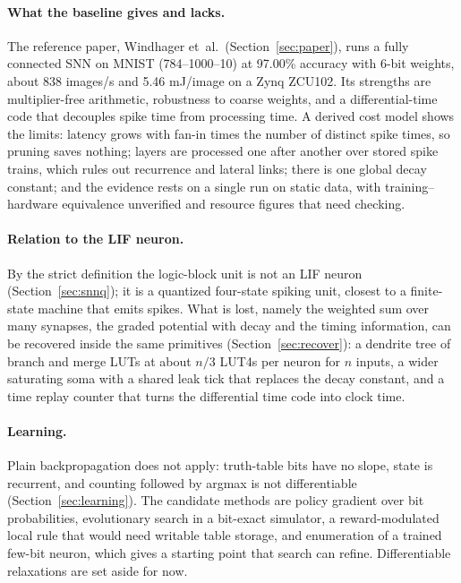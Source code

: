 \paragraph{What the baseline gives and lacks.} The reference paper, Windhager et~al.\ (Section~\ref{sec:paper}), runs a fully connected SNN on MNIST (784--1000--10) at 97.00\% accuracy with 6-bit weights, about 838 images/s and 5.46 mJ/image on a Zynq ZCU102. Its strengths are multiplier-free arithmetic, robustness to coarse weights, and a differential-time code that decouples spike time from processing time. A derived cost model shows the limits: latency grows with fan-in times the number of distinct spike times, so pruning saves nothing; layers are processed one after another over stored spike trains, which rules out recurrence and lateral links; there is one global decay constant; and the evidence rests on a single run on static data, with training--hardware equivalence unverified and resource figures that need checking.

\paragraph{Relation to the LIF neuron.} By the strict definition the logic-block unit is not an LIF neuron (Section~\ref{sec:snnq}); it is a quantized four-state spiking unit, closest to a finite-state machine that emits spikes. What is lost, namely the weighted sum over many synapses, the graded potential with decay and the timing information, can be recovered inside the same primitives (Section~\ref{sec:recover}): a dendrite tree of branch and merge LUTs at about $n/3$ LUT4s per neuron for $n$ inputs, a wider saturating soma with a shared leak tick that replaces the decay constant, and a time replay counter that turns the differential time code into clock time.

\paragraph{Learning.} Plain backpropagation does not apply: truth-table bits have no slope, state is recurrent, and counting followed by argmax is not differentiable (Section~\ref{sec:learning}). The candidate methods are policy gradient over bit probabilities, evolutionary search in a bit-exact simulator, a reward-modulated local rule that would need writable table storage, and enumeration of a trained few-bit neuron, which gives a starting point that search can refine. Differentiable relaxations are set aside for now.

